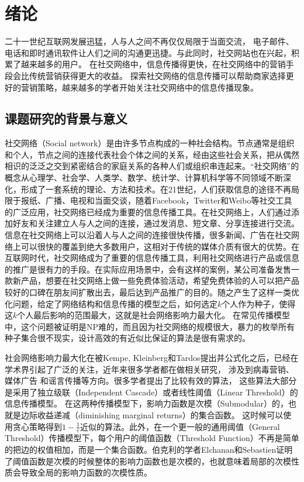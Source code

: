 
\chapter{绪论}
二十一世纪互联网发展迅猛，人与人之间不再仅仅局限于当面交流，
电子邮件、电话和即时通讯软件让人们之间的沟通更迅捷。与此同时，社交网站也在兴起，积累了越来越多的用户。
在社交网络中，信息传播得更快，在社交网络中的营销手段会比传统营销获得更大的收益。
探索社交网络的信息传播可以帮助商家选择更好的营销策略，越来越多的学者开始关注社交网络中的信息传播现象。


\section{课题研究的背景与意义}
社交网络（Social network）是由许多节点构成的一种社会结构。节点通常是组织和个人，节点之间的连接代表社会个体之间的关系，经由这些社会关系，把从偶然相识的泛泛之交到紧密结合的家庭关系的各种人们或组织串连起来。“社交网络”的概念从心理学、社会学、人类学、数学、统计学、计算机科学等不同领域不断深化，形成了一套系统的理论、方法和技术。在21世纪，人们获取信息的途径不再局限于报纸、广播、电视和当面交谈，随着Facebook，Twitter和Weibo等社交工具的广泛应用，社交网络已经成为重要的信息传播工具。在社交网络上，人们通过添加好友和关注建立人与人之间的连接，通过发消息、短文章、分享连接进行交流。信息在社交网络上可以沿着人与人之间的连接很快传播，很多新闻、广告在社交网络上可以很快的覆盖到绝大多数用户，这相对于传统的媒体介质有很大的优势。在互联网时代，社交网络成为了重要的信息传播工具，利用社交网络进行产品或信息的推广是很有力的手段。在实际应用场景中，会有这样的案例，某公司准备发售一款新产品，想要在社交网络上做一些免费体验活动，希望免费体验的人可以把产品较好的口碑在朋友间扩散出去，最后达到产品推广的目的。随之产生了这样一类优化问题，给定了网络结构和信息传播的模型之后，如何选定$k$个人作为种子，使得这$k$个人最后影响的范围最大，这就是社会网络影响力最大化\cite{Kempe2003maximizing}。
在常见传播模型中，这个问题被证明是NP难的，而且因为社交网络的规模很大，暴力的枚举所有种子集合很不现实，设计高效的有近似比保证的算法是很有需求的。

社会网络影响力最大化在被Kempe, Kleinberg和Tardos\cite{Kempe2003maximizing}提出并公式化之后，已经在学术界引起了广泛的关注，近年来很多学者都在做相关研究，
涉及到病毒营销\cite{arthur2009pricing,Subramani2003knowledge,barbieri2014influence,Chen2015combining}、
媒体广告\cite{li2011labeled,bakshy2012advertising,Aslay2015viral}
和谣言传播\cite{carnes2007maximizing,kostka2008word,borodin2010competitive,he2012influence,Wang2016drimux}等方向。很多学者提出了比较有效的算法\cite{Kempe2003maximizing,Leskovec2007celf,Chen2009efficient,chen2010sharpphard,goyal2011celfplus,Goyal2011simpath,tang2014newrrset}，
这些算法大部分是采用了独立级联（Independent Cascade）或者线性阈值（Linear Threshold）\cite{Kempe2003maximizing}的信息传播模型。
在这两种传播模型下，影响力函数是次模（Submodular）的，也就是边际收益递减（diminishing marginal returns）的集合函数。
这时候可以使用贪心策略得到$1-\frac{1}{e}$近似的算法。此外，在一个更一般的通用阈值（General Threshold）\cite{Kempe2003maximizing}传播模型下，每个用户的阈值函数（Threshold Function）不再是简单的把边的权值相加，而是一个集合函数。伯克利的学者Elchanan和Sebastien\cite{Mossel2007sub}证明了阈值函数是次模的时候整体的影响力函数也是次模的，也就意味着局部的次模性质会导致全局的影响力函数的次模性质。

